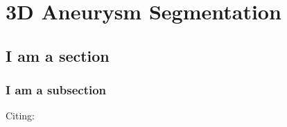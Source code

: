 \chapter{3D Aneurysm Segmentation}



\section{I am a section}



\subsection{I am a subsection}

Citing: \cite{Sample2016}


